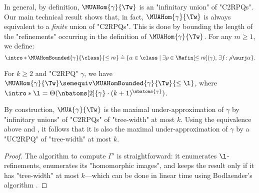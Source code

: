 In general, by definition,
$\MUAHom{\gamma}{\Tw}$ is an "infinitary union" of "C2RPQs". Our main technical result shows that,
in fact, $\MUAHom{\gamma}{\Tw}$ is always equivalent to a \emph{finite} union of "C2RPQs". This is done by bounding the length of the "refinements" occurring in the definition of $\MUAHom{\gamma}{\Tw}$.
For any $m \geq 1$, we define:
\AP
\[
    \intro*\MUAHomBounded{\gamma}{\class}{\leq m} \defeq 
    \{ 
        \alpha \in \class
        \mid
        \exists \rho \in \Refin[\leq m](\gamma),\, \exists \fun\colon \rho \surj \alpha
    \}.
\]
\newcommand{\lbound}[2]{\Theta(\nbatoms[2]{#2}\cdot ({#1}+1)^{\nbatoms{#2}})}
\begin{lemma}
    \AP\label{lemma:bound_size_refinements}
    \AP For $k \geq 2$ and "C2RPQ" $\gamma$, we have
    $\MUAHom{\gamma}{\Tw} \semequiv \MUAHomBounded{\gamma}{\Tw}{\leq\l}$, where
    $\intro*\l = \lbound{k}{\gamma}$.
\end{lemma}
By construction, $\MUA{\gamma}{\Tw}$ is the maximal under-approximation of $\gamma$ by
"infinitary unions" of "C2RPQs" of "tree-width" at most $k$. Using the equivalence above and
, it follows that
it is also the maximal under-approximation of $\gamma$ by
a "UC2RPQ" of "tree-width" at most $k$.
\muaexistseffective
\begin{proof}
	The algorithm to compute $\Gamma'$ is straightforward:
	it enumerates $\l$-refinements, enumerates its "homomorphic images",
	and keeps the result only if it has "tree-width" at most $k$---which can
	be done in linear time using Bodlaender's algorithm \cite[Theorem 1.1]{Bodlaender1996Treewidth}.
\end{proof}

